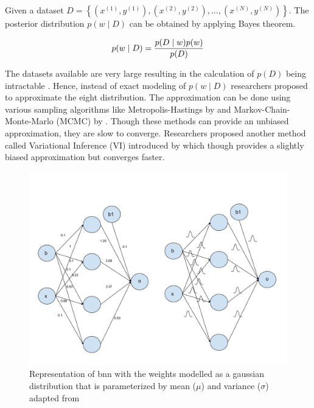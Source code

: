     Given a dataset $D=\left\{\left(x^{(1)}, y^{(1)}\right),\left(x^{(2)}, y^{(2)}\right), \ldots,\left(x^{(N)}, y^{(N)}\right)\right\}$. The posterior distribution $p(w \mid D)$ can be obtained by applying Bayes theorem.
    
    \begin{equation}
        \label{Bayes_Rule}
        p(w \mid D)=\frac{p(D \mid w) p(w)}{p(D)} \\
    \end{equation}
    
    The datasets available are very large resulting in the calculation of $p(D)$ being intractable \cite{gal2016uncertainty, shridhar2019comprehensive}. Hence, instead of exact modeling of $p(w \mid D)$ researchers proposed to approximate the eight distribution. The approximation can be done using various sampling algorithms like Metropolis-Hastings by \citet{Robert2015} and Markov-Chain-Monte-Marlo (MCMC) by \citet{mcmc}. Though these methods can provide an unbiased approximation, they are slow to converge. Researchers proposed another method called Variational Inference (VI) introduced by \citet{Graves2011} which though provides a slightly biased approximation but converges faster.
    
    \begin{figure}[H]
        \centering
        \includegraphics[scale=0.5]{images/frameworks/BNN.pdf}
        \caption[Comparison of Bayesian Neural Network and Fixed-weight Neural Network]{Representation of \acrshort{bnn} with the weights modelled as a gaussian distribution that is parameterized by mean ($\mu$) and variance ($\sigma$) adapted from \citet[pg 3]{shridhar2019comprehensive}}
        \label{fig:BNN}
    \end{figure}
    

